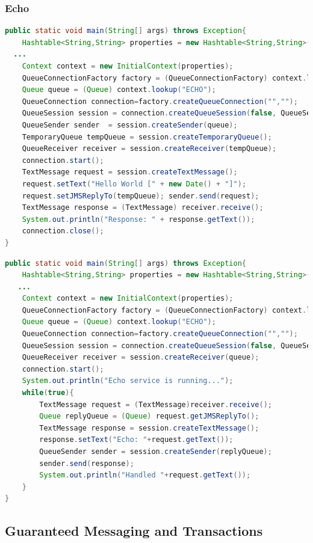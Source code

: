 \documentclass[10pt]{article}
\begin{document}
\subsubsection{Echo}
\begin{lstlisting}[language=Java, caption=Echo Client, style=JavaStyle]
public static void main(String[] args) throws Exception{ 
	Hashtable<String,String> properties = new Hashtable<String,String>();
  ...
	Context context = new InitialContext(properties);
	QueueConnectionFactory factory = (QueueConnectionFactory) context.lookup("ConnectionFactory");
	Queue queue = (Queue) context.lookup("ECHO");
	QueueConnection connection=factory.createQueueConnection("","");
	QueueSession session = connection.createQueueSession(false, QueueSession.AUTO_ACKNOWLEDGE);
	QueueSender sender  = session.createSender(queue);
	TemporaryQueue tempQueue = session.createTemporaryQueue();
	QueueReceiver receiver = session.createReceiver(tempQueue);
	connection.start();
	TextMessage request = session.createTextMessage(); 
	request.setText("Hello World [" + new Date() + "]");
	request.setJMSReplyTo(tempQueue); sender.send(request);
	TextMessage response = (TextMessage) receiver.receive();
	System.out.println("Response: " + response.getText());
	connection.close();
}
\end{lstlisting}
\begin{lstlisting}[language=Java, caption=Echo Server, style=JavaStyle]
public static void main(String[] args) throws Exception{ 
	Hashtable<String,String> properties = new Hashtable<String,String>();
   ...
	Context context = new InitialContext(properties);
	QueueConnectionFactory factory = (QueueConnectionFactory) context.lookup("ConnectionFactory");
	Queue queue = (Queue) context.lookup("ECHO");
	QueueConnection connection=factory.createQueueConnection("","");
	QueueSession session = connection.createQueueSession(false, QueueSession.AUTO_ACKNOWLEDGE);
	QueueReceiver receiver = session.createReceiver(queue); 
	connection.start();
	System.out.println("Echo service is running..."); 
	while(true){
		TextMessage request = (TextMessage)receiver.receive();
		Queue replyQueue = (Queue) request.getJMSReplyTo(); 
		TextMessage response = session.createTextMessage(); 
		response.setText("Echo: "+request.getText()); 
		QueueSender sender = session.createSender(replyQueue); 
		sender.send(response);
		System.out.println("Handled "+request.getText());
	}
}
\end{lstlisting}
\subsection{Guaranteed Messaging and Transactions}
\end{document}
